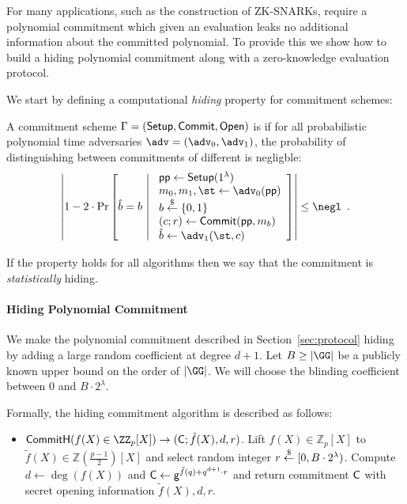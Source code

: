 For many applications, such as the construction of ZK-SNARKs, require a polynomial commitment which given an evaluation leaks no additional information about the committed polynomial. To provide this we show how to build a hiding polynomial commitment along with a zero-knowledge evaluation protocol.

We start by defining a computational \emph{hiding} property for commitment schemes:

\begin{definition}
A commitment scheme $\Gamma = (\textsf{{Setup}}, \textsf{{Commit}}, \textsf{{Open}})$ is  if for all probabilistic polynomial time adversaries $\adv = (\adv_0, \adv_1)$, the probability of distinguishing between commitments of different is negligble:
\[
	\left| 1 - 2 \cdot \mathrm{Pr}\left[
		\hat{b} = b \ \middle| \ 
		\begin{array}{l}
			\params \gets \pro{Setup}(1^\lambda) \\
			m_0, m_1, \st \gets \adv_0(\params) \\
			b \sample \{0,1\} \\
			(c; r) \gets \pro{Commit}(\params, m_b) \\
			\hat{b} \gets \adv_1(\st, c)
		\end{array}
	\right] \right| \leq \negl \enspace .
\]
\end{definition}
If the property holds for all algorithms then we say that the commitment is \emph{statistically} hiding.
\paragraph{Hiding Polynomial Commitment}
We make the polynomial commitment described in Section~\ref{sec:protocol} hiding by adding a large random coefficient at degree $d+1$. Let $B\geq |\GG|$ be a publicly known upper bound on the order of $|\GG|$. We will choose the blinding coefficient between $0$ and $B\cdot 2^\lambda$. 

Formally, the hiding commitment algorithm is described as follows:
\begin{itemize}
	\item $\pro{CommitH}(f(X) \in \ZZ_p[X]) \rightarrow (\gr{C}; \hat{f}(X), d, r)$. Lift $f(X) \in \mathbb{Z}_p[X]$ to $\tilde{f}(X) \in \mathbb{Z}(\frac{p-1}{2})[X]$ and select random integer $r \overset{\$}{\gets} [0,B\cdot 2^\lambda)$. Compute $d \gets \deg(f(X))$ and $\mathsf{C} \gets \mathsf{g}^{\tilde{f}(q)+q^{d+1} \cdot r}$ and return commitment $\mathsf{C}$ with secret opening information $\tilde{f}(X), d, r$.
\end{itemize}

